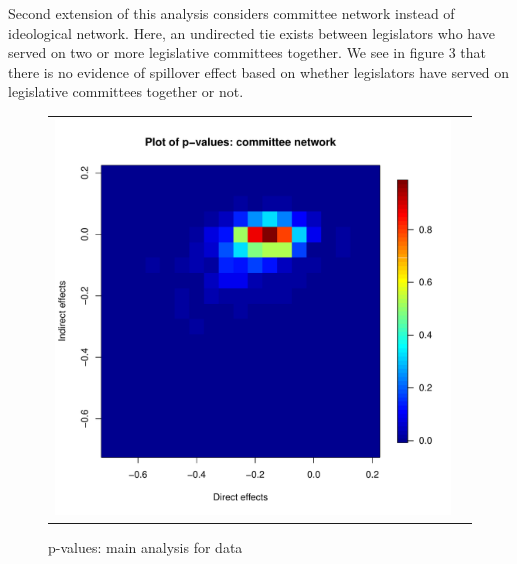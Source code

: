 \documentclass[12pt]{article}
\begin{document}
Second extension of this analysis considers committee network instead of ideological network. Here, an undirected tie exists between legislators who have served on two or more legislative committees together. We see in figure 3 that there is no evidence of spillover effect based on whether legislators have served on legislative committees together or not.
\begin{figure}
	\centering
	\begin{tabular}{cc}
	\includegraphics[scale=0.5]{./images/pvalues_figure_committee_at_least_one_Coppock.pdf}
	\end{tabular}
	\caption{p-values: main analysis for \citet{butler2011can} data}
\end{figure}
\end{document}
